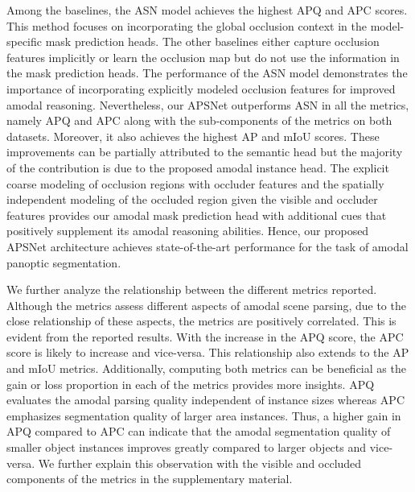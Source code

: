 \documentclass[10pt,twocolumn,letterpaper]{article}
\begin{document}
Among the baselines, the ASN model achieves the highest APQ and APC scores. This method focuses on incorporating the global occlusion context in the model-specific mask prediction heads. The other baselines either capture occlusion features implicitly or learn the occlusion map but do not use the information in the mask prediction heads. The performance of the ASN model demonstrates the importance of incorporating explicitly modeled occlusion features for improved amodal reasoning. Nevertheless, our \mbox{APSNet} outperforms ASN in all the metrics, namely APQ and APC along with the sub-components of the metrics on both datasets. Moreover, it also achieves the highest AP and mIoU scores. These improvements can be partially attributed to the semantic head but the majority of the contribution is due to the proposed amodal instance head. The explicit coarse modeling of occlusion regions with occluder features and the spatially independent modeling of the occluded region given the visible and occluder features provides our amodal mask prediction head with additional cues that positively supplement its amodal reasoning abilities. Hence, our proposed \mbox{APSNet} architecture achieves state-of-the-art performance for the task of amodal panoptic segmentation.

We further analyze the relationship between the different metrics reported. Although the metrics assess different aspects of amodal scene parsing, due to the close relationship of these aspects, the metrics are positively correlated. This is evident from the reported results. With the increase in the APQ score, the APC score is likely to increase and vice-versa. This relationship also extends to the AP and mIoU metrics. Additionally, computing both metrics can be beneficial as the gain or loss proportion in each of the metrics provides more insights. APQ evaluates the amodal parsing quality independent of instance sizes whereas APC emphasizes segmentation quality of larger area instances. Thus, a higher gain in APQ compared to APC can indicate that the amodal segmentation quality of smaller object instances improves greatly compared to larger objects and vice-versa. We further explain this observation with the visible and occluded components of the metrics in the supplementary material. 
\end{document}
